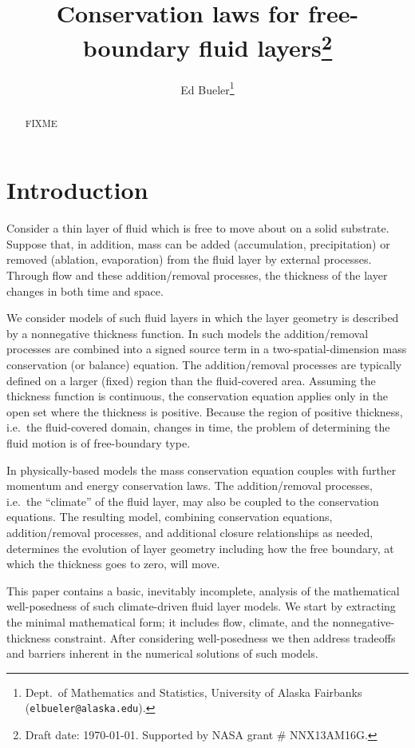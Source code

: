 \documentclass[final,onefignum]{siamart190516}
\title{Conservation laws for free-boundary fluid layers\thanks{Draft date: \today.  Supported by NASA grant \# NNX13AM16G.}}
\author{Ed Bueler\thanks{Dept.~of Mathematics and Statistics, University of Alaska Fairbanks \,\, (\texttt{elbueler@alaska.edu}).}}
\begin{document}
\maketitle

\begin{abstract}
FIXME
\end{abstract}


\pagestyle{myheadings}
\thispagestyle{plain}


\section{Introduction}  \label{sec:intro}

Consider a thin layer of fluid which is free to move about on a solid substrate.  Suppose that, in addition, mass can be added (accumulation, precipitation) or removed (ablation, evaporation) from the fluid layer by external processes.  Through flow and these addition/removal processes, the thickness of the layer changes in both time and space.

We consider models of such fluid layers in which the layer geometry is described by a nonnegative thickness function.  In such models the addition/removal processes are combined into a signed source term in a two-spatial-dimension mass conservation (or balance) equation.  The addition/removal processes are typically defined on a larger (fixed) region than the fluid-covered area.  Assuming the thickness function is continuous, the conservation equation applies only in the open set where the thickness is positive.  Because the region of positive thickness, i.e.~the fluid-covered domain, changes in time, the problem of determining the fluid motion is of free-boundary type.

In physically-based models the mass conservation equation couples with further momentum and energy conservation laws.  The addition/removal processes, i.e.~the ``climate'' of the fluid layer, may also be coupled to the conservation equations.  The resulting model, combining conservation equations, addition/removal processes, and additional closure relationships as needed, determines the evolution of layer geometry including how the free boundary, at which the thickness goes to zero, will move.

This paper contains a basic, inevitably incomplete, analysis of the mathematical well-posedness of such climate-driven fluid layer models.  We start by extracting the minimal mathematical form; it includes flow, climate, and the nonnegative-thickness constraint.  After considering well-posedness we then address tradeoffs and barriers inherent in the numerical solutions of such models.
\end{document}
